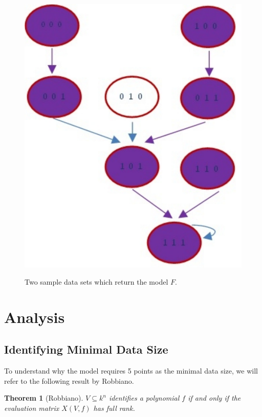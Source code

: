 \documentclass{amsart}
\newtheorem{thm}{Theorem}[section]
\theoremstyle{definition}
\theoremstyle{remark}
\theoremstyle{example}
\theoremstyle{conjecture}
\numberwithin{equation}{section}
\begin{document}
\begin{figure}
  \centering
   \includegraphics[scale=0.3]{data2.pdf}\\
  \caption{Two sample data sets which return the model $F$.}\label{}
\end{figure}

\section{Analysis}

\subsection {Identifying Minimal Data Size}
To understand why the model requires 5 points as the minimal data size, we will refer to the following result by Robbiano. 

\begin{thm}[Robbiano\cite{robbiano}]
\label{robbiano} $V\subseteq k^n$ identifies a polynomial $f$ if and
only if the evaluation matrix $X(V,f)$ has full rank.
\end{thm}
\end{document}

